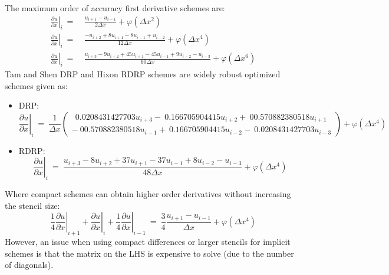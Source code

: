\documentclass[conf]{new-aiaa}
\begin{document}
\noindent
The maximum order of accuracy first derivative schemes are:
\begin{equation*}
	\begin{split}
		\left.\frac{\partial{u}}{\partial{x}}\right|_{i}~=&~\frac{u_{i+1}-u_{i-1}}{2\Delta{x}} +\varphi\left(\Delta{x^2}\right) \\
		\left.\frac{\partial{u}}{\partial{x}}\right|_{i}~=&~\frac{-u_{i+2}+8u_{i+1}-8u_{i-1}+u_{i-2}}{12\Delta{x}}  +\varphi\left(\Delta{x^4}\right) \\
		\left.\frac{\partial{u}}{\partial{x}}\right|_{i}~=&~\frac{u_{i+3}-9u_{i+2}+45u_{i+1}-45u_{i-1}+9u_{i-2}-u_{i-3}}{60\Delta{x}}  +\varphi\left(\Delta{x^6}\right) 
	\end{split}
\end{equation*}
Tam and Shen DRP \cite{DRP} and Hixon RDRP \cite{RDRP} schemes are widely robust optimized schemes given as:
\begin{itemize}
	\item DRP:
		\begin{equation*}
			\left.\frac{\partial{u}}{\partial{x}}\right|_{i}~=~\frac{1}{\Delta{x}}
				\left(\begin{matrix} 	
					~~0.0208431427703u_{i+3} 
					-~0.166705904415u_{i+2}  
					+~00.570882380518u_{i+1}  \\
					-~00.570882380518u_{i-1}  
					+~0.166705904415u_{i-2}  
					-~0.0208431427703u_{i-3}
				\end{matrix}
				\right)+\varphi\left(\Delta{x^4}\right) 
		\end{equation*}
	\item RDRP:
		\begin{equation*}
			\left.\frac{\partial{u}}{\partial{x}}\right|_{i}~=~\frac{u_{i+3}-8u_{i+2}+37u_{i+1}-37u_{i-1}+8u_{i-2}-u_{i-3}}{48\Delta{x}}+\varphi\left(\Delta{x^4}\right) 
		\end{equation*}
\end{itemize}
Where compact schemes can obtain higher order derivatives without increasing the stencil size:
\begin{equation*}
    \frac{1}{4}\left.\frac{\partial{u}}{\partial{x}}\right|_{i+1} + 
    \left.\frac{\partial{u}}{\partial{x}}\right|_{i} + 
    \frac{1}{4}\left.\frac{\partial{u}}{\partial{x}}\right|_{i-1}~=~\frac{3}{4}\frac{u_{i+1}-u_{i-1}}{\Delta{x}} +\varphi\left(\Delta{x^4}\right)
\end{equation*}
However, an issue when using compact differences or larger stencils for implicit schemes is that the matrix on the LHS is expensive to solve (due to the number of diagonals). 
\end{document}
